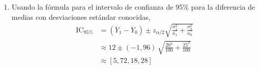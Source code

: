 \documentclass[10pt,a4paper]{article}
\begin{document}
\begin{enumerate}
{\begin{enumerate}
            \item Usando la fórmula para el intervalo de confianza de 95\% para la diferencia de medias con desviaciones estándar conocidas,
                \begin{align*}
                    \mathrm{IC}_{95\%}
                    &=
                    \left(
                        \overline Y_1
                        -
                        \overline Y_0
                    \right)
                    \pm
                    z_{\alpha/2}
                    \sqrt{
                        \frac
                            {
                                \sigma_1^2
                            }
                            {
                                n_1
                            }
                        +
                        \frac
                            {
                                \sigma_0^2
                            }
                            {
                                n_0
                            }
                    }
                    \\[2ex]
                    &\approx
                    12
                    \pm
                    (-1,96)
                    \,
                    \sqrt{
                       \frac
                            {
                                20^2
                            }
                            {
                                100
                            }
                        +
                        \frac
                            {
                                25^2
                            }
                            {
                                100
                            } 
                    }
                    \\[2ex]
                    &\approx
                    \left[
                        5,72
                        ,
                        18,28
                    \right]
                \end{align*}


\end{enumerate}}
\end{enumerate}
\end{document}
